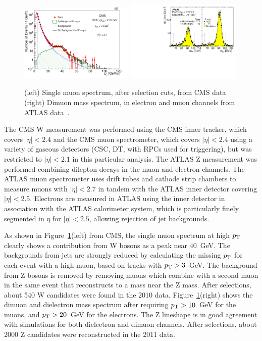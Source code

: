 \begin{figure}[!th]
\begin{center}
\includegraphics[width=0.49\textwidth]{electroweak_figs/Fig1a.pdf}
\includegraphics[width=0.49\textwidth]{electroweak_figs/fig_01.pdf}
\caption[]{(left) Single muon spectrum, after selection cuts, from CMS data~\cite{Chatrchyan:2012nt} (right) Dimuon mass spectrum, in electron and muon channels from ATLAS data~\cite{Aad:2012ew}.}
\label{fig:pas:zw_signal}
\end{center}
\end{figure}
The CMS W measurement was performed using the CMS inner tracker, which covers $|\eta|<2.4$
and the CMS muon spectrometer, which covers $|\eta|<2.4$ using a variety of gaseous detectors
(CSC, DT, with RPCs used for triggering), but was restricted to $|\eta|<2.1$ in this particular analysis.
The ATLAS Z measurement was performed combining dilepton decays in the muon and electron channels.
The ATLAS muon spectrometer uses drift tubes and cathode strip chambers to measure muons with $|\eta|<2.7$
in tandem with the ATLAS inner detector covering $|\eta|<2.5$.
Electrons are measured in ATLAS using the inner detector in association with the ATLAS calorimeter system,
which is particularly finely segmented in $\eta$ for $|\eta|<2.5$, allowing rejection of jet backgrounds.

As shown in Figure~\ref{fig:pas:zw_signal}(left) from CMS, the single muon spectrum at high $\mbox{$p_{\mathrm{T}}$}$ clearly shows a contribution
from W bosons as a peak near 40~GeV.
The backgrounds from jets are strongly reduced by calculating the missing $\mbox{$p_{\mathrm{T}}$}$ for each event with a
high \pT muon, based on tracks with $\mbox{$p_{\mathrm{T}}$}>3$~GeV.  The background from Z bosons is removed by removing muons which
combine with a second muon in the same event that reconstructs to a mass near the Z mass.
After selections, about 540 W candidates were found in the 2010 \PbPb data.
%
Figure~\ref{fig:pas:zw_signal}(right) shows the dimuon and dielectron mass spectrum after requiring $\mbox{$p_{\mathrm{T}}$}>10$~GeV for
the muons, and $\mbox{$p_{\mathrm{T}}$}>20$~GeV for the electrons.  The Z lineshape is in good agreement with simulations for both
dielectron and dimuon channels.
After selections, about 2000 Z candidates were reconstructed in the 2011 \PbPb data.


